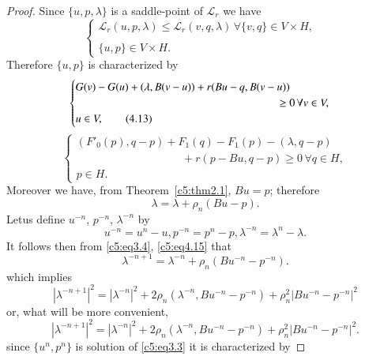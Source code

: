 \begin{proof}
Since $\{u, p, \lambda \}$ is a saddle-point of $\mathscr{L}_r$ we have
\begin{equation}
\begin{cases}
\mathscr{L}_r (u, p, \lambda) \leq \mathscr{L}_r (v, q, \lambda)\, \forall \{v, q \} \in V \times H, \\
& \\
\{u, p \} \in V \times H. \tag{4.12}\label{c5:eq4.12}
\end{cases}
\end{equation}
Therefore $\{u, p \}$ is characterized by 
\begin{equation}
\begin{cases}
G (v) - G (u) + (\lambda, B (v-u)) + r (Bu - q, B (v-u))\\ 
\hspace{6.5cm} \geq 0\, \forall v \in V, \\ 
u \in V,\tag{4.13}\label{c5:eq4.13}
\end{cases}
\end{equation}
\begin{equation}
\begin{cases}
(F'_0 (p), q-p) + F_1 (q) - F _1 (p) - (\lambda, q-p)\\ 
  \hspace{4cm} + r (p - Bu,  q-p) \geq 0\, \forall q \in H, \\ 
p \in H. \tag{4.14}\label{c5:eq4.14}
\end{cases}
\end{equation}
Moreover we have, from Theorem~\ref{c5:thm2.1}, $Bu = p$; therefore 
\begin{equation}
\lambda = \lambda + \rho_n (Bu - p).\tag{4.15}\label{c5:eq4.15}
\end{equation}
    Let\pageoriginale  us define $u^{-n}$, $p^{-n}$, $\lambda^{-n}$ by 
  $$
  u^{-n} = u^n -u, p^{-n} = p^n - p, \lambda^{-n} = \lambda^n - \lambda.
  $$
  It follows then from \eqref{c5:eq3.4}, \eqref{c5:eq4.15} that 
  $$
  \lambda^{-n+1} = \lambda^{-n} + \rho_n (Bu^{-n} - p^{-n}).
  $$
  which implies 
  $$
|\lambda^{-n+1}|^2 = |\lambda^{-n}|^2 + 2\rho_n (\lambda^{-n}, Bu^{-n} 
- p^{-n}) + \rho_n^2 |B u^{-n} - p^{-n}|^2
  $$
  or, what will be more convenient, 
  \begin{equation}
 |\lambda^{-n+1}|^2 = |\lambda^{-n}|^2 + 2\rho_n (\lambda^{-n}, Bu^{-n} - p^{-n}) + \rho_n^2 |B u^{-n} - p^{-n}|^2.\tag{4.16}\label{c5:eq4.16}
\end{equation}
since $\{u^n, p^n \}$ is solution of \eqref{c5:eq3.3} it is characterized by 

\end{proof}
